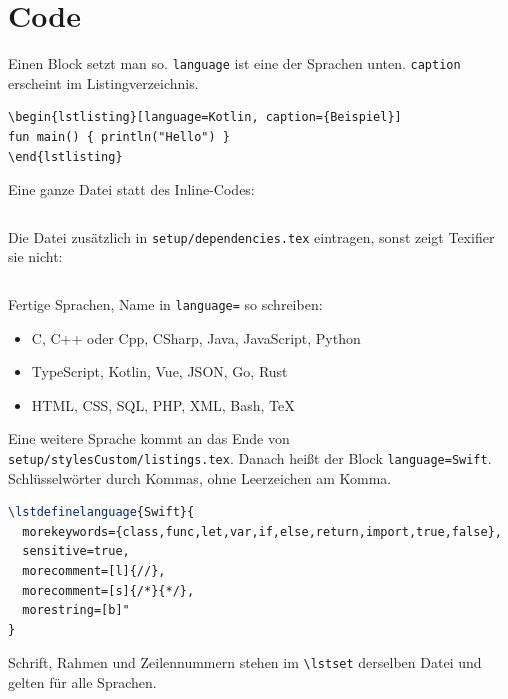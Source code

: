 \documentclass[11pt,a4paper]{article}
\begin{document}
\section*{Code}

Einen Block setzt man so. \texttt{language} ist eine der Sprachen unten. \texttt{caption} erscheint im Listingverzeichnis.

\begin{verbatim}
\begin{lstlisting}[language=Kotlin, caption={Beispiel}]
fun main() { println("Hello") }
\end{lstlisting}
\end{verbatim}

Eine ganze Datei statt des Inline-Codes:

\begin{lstlisting}[language=TeX]

\end{lstlisting}

Die Datei zusätzlich in \texttt{setup/dependencies.tex} eintragen, sonst zeigt Texifier sie nicht:

\begin{lstlisting}[language=TeX]
%_force-texpad-dependency: code/Orchestrator.java
\end{lstlisting}

Fertige Sprachen, Name in \texttt{language=} so schreiben:

\begin{itemize}
\item C, C++ oder Cpp, CSharp, Java, JavaScript, Python
\item TypeScript, Kotlin, Vue, JSON, Go, Rust
\item HTML, CSS, SQL, PHP, XML, Bash, TeX
\end{itemize}

Eine weitere Sprache kommt an das Ende von \texttt{setup/stylesCustom/listings.tex}. Danach heißt der Block \texttt{language=Swift}. Schlüsselwörter durch Kommas, ohne Leerzeichen am Komma.

\begin{lstlisting}[language=TeX]
\lstdefinelanguage{Swift}{
  morekeywords={class,func,let,var,if,else,return,import,true,false},
  sensitive=true,
  morecomment=[l]{//},
  morecomment=[s]{/*}{*/},
  morestring=[b]"
}
\end{lstlisting}

Schrift, Rahmen und Zeilennummern stehen im \verb|\lstset| derselben Datei und gelten für alle Sprachen.
\end{document}
